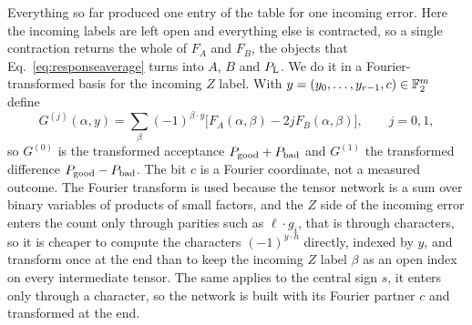 Everything so far produced one entry of the table for one incoming error. Here the incoming labels are left open and everything else is contracted, so a single contraction returns the whole of $F_A$ and $F_B$, the objects that Eq.~\eqref{eq:responseaverage} turns into $A$, $B$ and $P_{\mathrm L}$. We do it in a Fourier-transformed basis for the incoming $Z$ label. With $y=(y_0,\ldots,y_{r-1},c)\in\mathbb F_2^m$ define
\begin{equation}
 G^{(j)}(\alpha,y)=\sum_\beta(-1)^{\beta\cdot y}\big[F_A(\alpha,\beta)-2jF_B(\alpha,\beta)\big],\qquad j=0,1,
 \label{eq:G}
\end{equation}
so $G^{(0)}$ is the transformed acceptance $P_{\rm good}+P_{\rm bad}$ and $G^{(1)}$ the transformed difference $P_{\rm good}-P_{\rm bad}$. The bit $c$ is a Fourier coordinate, not a measured outcome. 
The Fourier transform is used because the tensor network is a sum over binary variables of products of small factors, and the $Z$ side of the incoming error enters the count only through parities such as $\ell\cdot g_i$, that is through characters, so it is cheaper to compute the characters $(-1)^{y\cdot h}$ directly, indexed by $y$, and transform once at the end than to keep the incoming $Z$ label $\beta$ as an open index on every intermediate tensor. The same applies to the central sign $s$, it enters only through a character, so the network is built with its Fourier partner $c$ and transformed at the end.

